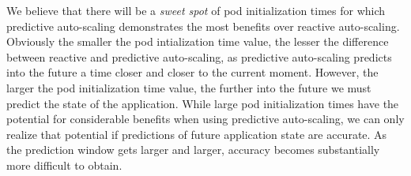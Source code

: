 We believe that there will be a \textit{sweet spot} of pod initialization times
for which predictive auto-scaling demonstrates the most benefits over reactive
auto-scaling. Obviously the smaller the pod intialization time value, the lesser
the difference between reactive and predictive auto-scaling, as predictive
auto-scaling predicts into the future a time closer and closer to the current
moment. However, the larger the pod initialization time value, the further into
the future we must predict the state of the application. While large pod
initialization times have the potential for considerable benefits when using
predictive auto-scaling, we can only realize that potential if predictions of
future application state are accurate. As the prediction window gets larger and
larger, accuracy becomes substantially more difficult to obtain.
